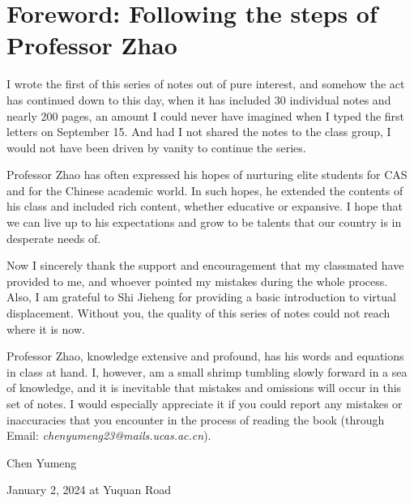 \chapter{Foreword: Following the steps of Professor Zhao}

I wrote the first of this series of notes out of pure interest, and somehow the act has continued down to this day, when it has included 30 individual notes and nearly 200 pages, an amount I could never have imagined when I typed the first letters on September 15. And had I not shared the notes to the class group, I would not have been driven by vanity to continue the series.

Professor Zhao has often expressed his hopes of nurturing elite students for CAS and for the Chinese academic world. In such hopes, he extended the contents of his class and included rich content, whether educative or expansive. I hope that we can live up to his expectations and grow to be talents that our country is in desperate needs of.

Now I sincerely thank the support and encouragement that my classmated have provided to me, and whoever pointed my mistakes during the whole process. Also, I am grateful to Shi Jieheng for providing a basic introduction to virtual displacement. Without you, the quality of this series of notes could not reach where it is now.

Professor Zhao, knowledge extensive and profound, has his words and equations in class at hand. I, however, am a small shrimp tumbling slowly forward in a sea of knowledge, and it is inevitable that mistakes and omissions will occur in this set of notes. I would especially appreciate it if you could report any mistakes or inaccuracies that you encounter in the process of reading the book (through Email: \emph{chenyumeng23@mails.ucas.ac.cn}).

\begin{flushright}
    Chen Yumeng

    January 2, 2024 at Yuquan Road
\end{flushright}
